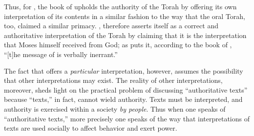 \noindent
Thus, for \vanderkam, the book of \jub upholds the authority of the Torah by offering its own interpretation of its contents in a similar fashion to the way that the oral Torah, too, claimed a similar primacy. \jub, therefore asserts itself as a correct and authoritative interpretation of the Torah by claiming that it is the interpretation that Moses himself received from God; as \vanderkam puts it, according to the book of \jub, ``[t]he message of \jub is verbally inerrant.''\autocite[33]{vanderkam_metso-etal2010}

The fact that \jub offers a \emph{particular} interpretation, however, assumes the possibility that other interpretations may exist. The reality of other interpretations, moreover, sheds light on the practical problem of discussing ``authoritative texts'' because ``texts,'' in fact, cannot wield authority. Texts must be interpreted, and authority is exercised within a society \emph{by people}. Thus when one speaks of ``authoritative texts,'' more precisely one speaks of the way that interpretations of texts are used socially to affect behavior and exert power.\autocite{foucault_ci1982}

